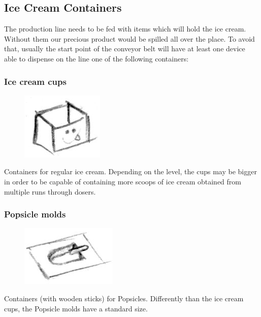 \documentclass[a4paper]{scrartcl}
\begin{document}
    \subsection{Ice Cream Containers}
        The production line needs to be fed with items which will hold the ice
        cream. Without them our precious product would be spilled all over the
        place. To avoid that, usually the start point of the conveyor belt will
        have at least one device able to dispense on the line one of the
        following containers:

        \subsubsection{Ice cream cups}
            \begin{minipage}[t][3em][t]{\textwidth}
                \begin{figure}
                    \vspace{-15pt}
                    \includegraphics[scale=1]{devices/pint}
                    \vspace{-20pt}
                \end{figure}

                Containers for regular ice cream. Depending on the level, the
                cups may be bigger in order to be capable of containing more
                scoops of ice cream obtained from multiple runs through dosers.
            \end{minipage}

        \subsubsection{Popsicle molds}
            \begin{minipage}[t][2em][t]{\textwidth}
                \begin{figure}
                    \vspace{-15pt}
                    \includegraphics[scale=1]{devices/popsicle_molds}
                    \vspace{-25pt}
                \end{figure}

                Containers (with wooden sticks) for Popsicles. Differently than
                the ice cream cups, the Popsicle molds have a standard size.
            \end{minipage}
\end{document}
